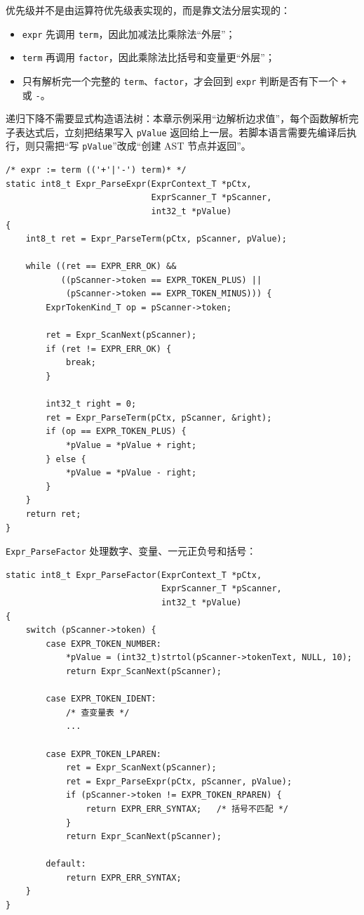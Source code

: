 优先级并不是由运算符优先级表实现的，而是靠文法分层实现的：

\begin{itemize}
\item \texttt{expr} 先调用 \texttt{term}，因此加减法比乘除法“外层”；
\item \texttt{term} 再调用 \texttt{factor}，因此乘除法比括号和变量更“外层”；
\item 只有解析完一个完整的 \texttt{term}、\texttt{factor}，才会回到 \texttt{expr} 判断是否有下一个 \texttt{+} 或 \texttt{-}。
\end{itemize}

递归下降不需要显式构造语法树：本章示例采用“边解析边求值”，每个函数解析完子表达式后，立刻把结果写入 \texttt{pValue} 返回给上一层。若脚本语言需要先编译后执行，则只需把“写 \texttt{pValue}”改成“创建 AST 节点并返回”。

\begin{lstlisting}[style=c]
/* expr := term (('+'|'-') term)* */
static int8_t Expr_ParseExpr(ExprContext_T *pCtx,
                             ExprScanner_T *pScanner,
                             int32_t *pValue)
{
    int8_t ret = Expr_ParseTerm(pCtx, pScanner, pValue);

    while ((ret == EXPR_ERR_OK) &&
           ((pScanner->token == EXPR_TOKEN_PLUS) ||
            (pScanner->token == EXPR_TOKEN_MINUS))) {
        ExprTokenKind_T op = pScanner->token;

        ret = Expr_ScanNext(pScanner);
        if (ret != EXPR_ERR_OK) {
            break;
        }

        int32_t right = 0;
        ret = Expr_ParseTerm(pCtx, pScanner, &right);
        if (op == EXPR_TOKEN_PLUS) {
            *pValue = *pValue + right;
        } else {
            *pValue = *pValue - right;
        }
    }
    return ret;
}
\end{lstlisting}

\texttt{Expr\_ParseFactor} 处理数字、变量、一元正负号和括号：

\begin{lstlisting}[style=c]
static int8_t Expr_ParseFactor(ExprContext_T *pCtx,
                               ExprScanner_T *pScanner,
                               int32_t *pValue)
{
    switch (pScanner->token) {
        case EXPR_TOKEN_NUMBER:
            *pValue = (int32_t)strtol(pScanner->tokenText, NULL, 10);
            return Expr_ScanNext(pScanner);

        case EXPR_TOKEN_IDENT:
            /* 查变量表 */
            ...

        case EXPR_TOKEN_LPAREN:
            ret = Expr_ScanNext(pScanner);
            ret = Expr_ParseExpr(pCtx, pScanner, pValue);
            if (pScanner->token != EXPR_TOKEN_RPAREN) {
                return EXPR_ERR_SYNTAX;   /* 括号不匹配 */
            }
            return Expr_ScanNext(pScanner);

        default:
            return EXPR_ERR_SYNTAX;
    }
}
\end{lstlisting}

